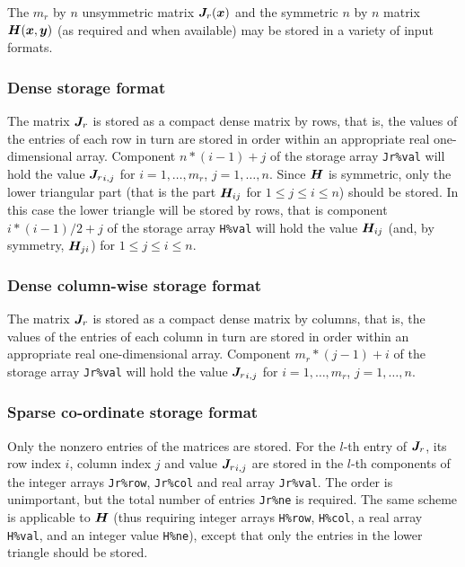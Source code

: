 \documentclass{galahad}
\begin{document}

\galmatrix The $m_r$ by $n$ unsymmetric matrix ${\bm{J}}_r({\bm{x}})$ and 
the symmetric $n$ by $n$ matrix ${\bm{H}}({\bm{x}},{\bm{y}})$
(as required and when available) may be stored in a variety of input formats.

\subsubsection{Dense storage format}\label{dense}
The matrix ${\bm{J}}_r$ is stored as a compact
dense matrix by rows, that is, the values of the entries of each row in turn are
stored in order within an appropriate real one-dimensional array.
Component $n \ast (i-1) + j$ of the storage array {\tt  Jr\%val} will hold 
the value ${{\bm{J}}_r}_{i,j}$ for $i = 1, \ldots , m_r$, $j = 1, \ldots , n$. 
Since ${\bm{H}}$ is symmetric, only the lower triangular
part (that is the part ${\bm{H}}_{ij}$ for $1 \leq j \leq i \leq n$)
should be stored. In this case the lower triangle will be stored by rows,
that is component $i \ast (i-1)/2 + j$ of the storage array {\tt H\%val} will
hold the value ${\bm{H}}_{ij}$ (and, by symmetry, ${\bm{H}}_{ji}$) for $1 \leq j
\leq i \leq n$.

\subsubsection{Dense column-wise storage format}\label{dense-column}
The matrix ${\bm{J}}_r$ is stored as a compact
dense matrix by columns, that is, the values of the entries of each column
in turn are stored in order within an appropriate real one-dimensional array.
Component $m_r \ast (j-1) + i$ of the storage array {\tt  Jr\%val} will 
hold the value ${{\bm{J}}_r}_{i,j}$ for $i = 1, \ldots , m_r$, $j = 1, \ldots , n$.

\subsubsection{Sparse co-ordinate storage format}\label{coordinate}
Only the nonzero entries of the matrices are stored. For the $l$-th
entry of ${\bm{J}}_r$, its row index $i$, column index $j$ and value
${{\bm{J}}_r}_{i,j}$ are stored in the $l$-th components of the integer arrays
{\tt Jr\%row}, {\tt Jr\%col} and real array {\tt Jr\%val}.
The order is unimportant, but the total number of entries {\tt Jr\%ne} is
required.  The same scheme is applicable to ${\bm{H}}$
(thus requiring integer arrays {\tt H\%row}, {\tt H\%col}, a real
array {\tt H\%val}, and an integer value {\tt H\%ne}), except that only
the entries in the lower triangle should be stored.
\end{document}
